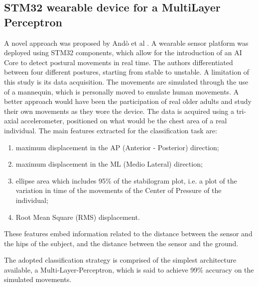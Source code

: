 \subsection{STM32 wearable device for a MultiLayer Perceptron}
A novel approach was proposed by Andò et al \cite{PosturalClasses}. A wearable sensor platform was deployed using STM32 components, which allow for the introduction of an AI Core to detect postural movements in real time. The authors differentiated between four different postures, starting from stable to unstable. 
A limitation of this study is its data acquisition. The movements are simulated through the use of a mannequin, which is personally moved to emulate human movements. A better approach would have been the participation of real older adults and study their own movements as they wore the device. The data is acquired using a tri-axial accelerometer, positioned on what would be the chest area of a real individual. 
The main features extracted for the classification task are:
\begin{enumerate}
    \itemsep0cm 
    \item maximum displacement in the AP (Anterior - Posterior) direction;
    \item maximum displacement in the ML (Medio Lateral) direction;
    \item ellipse area which includes 95\% of the stabilogram plot, i.e. a plot of the variation in time of the movements of the Center of Pressure of the individual;  
    \item Root Mean Square (RMS) displacement.
\end{enumerate}
These features embed information related to the distance between the sensor and the hips of the subject, and the distance between the sensor and the ground. 

The adopted classification strategy is comprised of the simplest architecture available, a Multi-Layer-Perceptron, which is said to achieve 99\% accuracy on the simulated movements.

